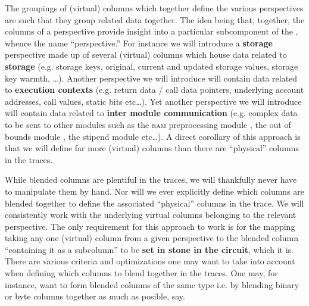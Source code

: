 The groupings of (virtual) columns which together define the various perspectives are such that they group related data together.
The idea being that, together, the columns of a perspective provide insight into a particular subcomponent of the \evm{}, whence the name ``perspective.''
For instance we will introduce a \textbf{storage} perspective made up of several (virtual) columns which house data related to \textbf{storage} (e.g. storage keys, original, current and updated storage values, storage key warmth, \dots{}).
Another perspective we will introduce will contain data related to \textbf{execution contexts} (e.g. return data / call data pointers, underlying account addresses, call values, static bits etc\dots).
Yet another perspective we will introduce will contain data related to \textbf{inter module communication} (e.g. complex data to be sent to other modules such as the \textsc{ram} preprocessing module \mmuMod{}, the out of bounds module \oobMod{}, the stipend module \stpMod{} etc\dots).
\saNote{} A direct corollary of this approach is that we will define far more (virtual) columns than there are ``physical'' columns in the traces.

While blended columns are plentiful in the traces, we will thankfully never have to manipulate them by hand.
Nor will we ever explicitly define which columns are blended together to define the associated ``physical'' columns in the trace.
We will consistently work with the underlying virtual columns belonging to the relevant perspective.
The only requirement for this approach to work is for the mapping taking any one (virtual) column from a given perspective to the blended column ``containing it as a subcolumn'' to be \textbf{set in stone in the circuit}, which it is.
\saNote{} There are various criteria and optimizations one may want to take into account when defining which columns to blend together in the traces.
One may, for instance, want to form blended columns of the same type i.e. by blending binary or byte columns together as much as posible, say.

